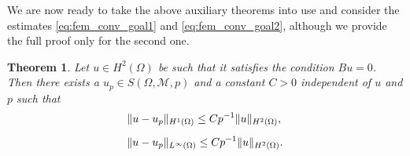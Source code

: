\documentclass[english, 12pt, a4paper, sci, utf8, a-2b, online]{aaltothesis}
\theoremstyle{definition}
\theoremstyle{plain}
\newtheorem{theorem}{Theorem}[section]
\DeclarePairedDelimiter\norm{\lVert}{\rVert}
\numberwithin{equation}{section}
\begin{document}
We are now ready to take the above auxiliary theorems into use
and consider the estimates \eqref{eq:fem_conv_goal1} and \eqref{eq:fem_conv_goal2},
although we provide the full proof only for the second one.
\begin{theorem}
    \label{thm:approximation_properties_of_S}
    Let $u \in H^2(\Omega)$ be such that it satisfies the condition $Bu = 0$.
    Then there exists a $u_p \in S(\Omega, \mathcal{M}, p)$ and
    a constant $C > 0$ independent of $u$ and $p$ such that
    \begin{align}
        \label{eq:approximation_properties_of_S_res1}
        &\norm{u-u_p}_{H^1(\Omega)} \leq C p^{-1} \norm{u}_{H^2(\Omega)}, \\[0.5em]
        \label{eq:approximation_properties_of_S_res2}
        &\norm{u-u_p}_{L^{\infty}(\Omega)} \leq C p^{-1} \norm{u}_{H^2(\Omega)}.
    \end{align}
\end{theorem}
\end{document}
